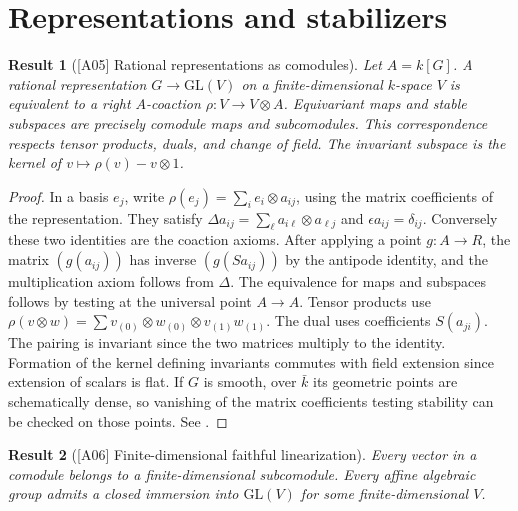 \documentclass[11pt,a4paper,openany,oneside]{book}
\theoremstyle{resultstyle}
\newtheorem{statement}{Result}[chapter]
\newenvironment{result}[2]{\clubpenalty=10000\begin{statement}[\textnormal{[#1]} #2]\leavevmode\label{res:#1}\ignorespaces}{\end{statement}}
\theoremstyle{definition}
\numberwithin{equation}{chapter}
\begin{document}
\section{Representations and stabilizers}

\begin{result}{A05}{Rational representations as comodules}
Let \(A=k[G]\). A rational representation \(G\to\mathrm{GL}(V)\) on a
finite-dimensional \(k\)-space \(V\) is equivalent to a right \(A\)-coaction
\(\rho:V\to V\otimes A\). Equivariant maps and stable subspaces are
precisely comodule maps and subcomodules. This correspondence respects
tensor products, duals, and change of field. The invariant subspace is
the kernel of \(v\mapsto \rho(v)-v\otimes1\).
\end{result}

\begin{proof}
In a basis \(e_j\), write
\(\rho(e_j)=\sum_i e_i\otimes a_{ij}\), using the matrix coefficients of
the representation. They satisfy
\(\Delta a_{ij}=\sum_\ell a_{i\ell}\otimes a_{\ell j}\) and
\(\epsilon a_{ij}=\delta_{ij}\). Conversely these two identities are
the coaction axioms. After applying a point \(g:A\to R\), the matrix
\((g(a_{ij}))\) has inverse \((g(Sa_{ij}))\) by the antipode identity,
and the multiplication axiom follows from \(\Delta\).
The equivalence for maps and subspaces follows by testing at the
universal point \(A\to A\). Tensor products use
\(\rho(v\otimes w)=\sum v_{(0)}\otimes w_{(0)}
 \otimes v_{(1)}w_{(1)}\). The dual uses coefficients \(S(a_{ji})\).
The pairing is invariant since the two matrices multiply to the
identity. Formation of the kernel defining invariants commutes with
field extension since extension of scalars is flat. If \(G\) is smooth,
over \(\bar k\) its geometric points are schematically dense, so
vanishing of the matrix coefficients testing stability can be checked
on those points. See \cite[\S4.a--b, Proposition 4.31 and Corollary 4.34]{milne}.
\end{proof}

\begin{result}{A06}{Finite-dimensional faithful linearization}
Every vector in a comodule belongs to a finite-dimensional subcomodule.
Every affine algebraic group admits a closed immersion into
\(\mathrm{GL}(V)\) for some finite-dimensional \(V\).
\end{result}
\end{document}
